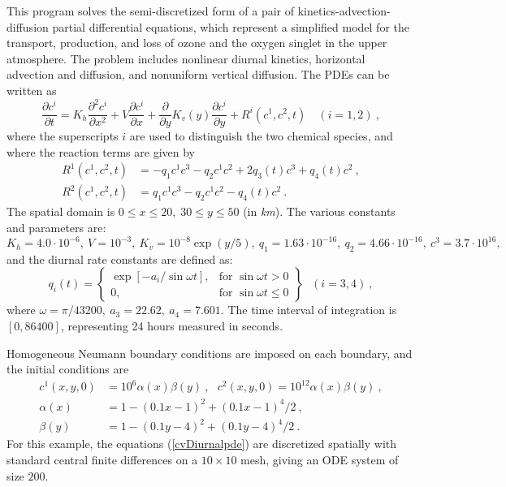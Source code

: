This program solves the semi-discretized form of a pair of
kinetics-advection-diffusion partial differential equations, which
represent a simplified model for the transport, production, and loss
of ozone and the oxygen singlet in the upper atmosphere.  The problem
includes nonlinear diurnal kinetics, horizontal advection and diffusion, 
and nonuniform vertical diffusion.  The PDEs can be written as
\begin{equation}\label{cvDiurnalpde}
  \frac{\partial c^i}{\partial t}=K_h\frac{\partial^2 c^i}{\partial x^2}
  +V \frac{\partial c^i}{\partial x}
  + \frac{\partial} {\partial y} K_v(y) \frac{\partial c^i}{\partial y}
  + R^i(c^1,c^2,t) \quad (i=1,2)~,
\end{equation}
where the superscripts $i$ are used to distinguish the two chemical
species, and where the reaction terms are given by
\begin{equation}\label{e:cvDiurnal:r}
\begin{split}
  R^1(c^1,c^2,t) & = -q_1c^1c^3-q_2c^1c^2+2q_3(t)c^3+q_4(t)c^2 ~, \\
  R^2(c^1,c^2,t) & = q_1c^1c^3-q_2c^1c^2-q_4(t)c^2 ~.
\end{split}
\end{equation}
The spatial domain is $0 \leq x \leq 20,\;30 \leq y \leq 50$ (in {\it km}). 
The various constants and parameters are: $K_h=4.0\cdot 10^{-6},
~ V=10^{-3},~ K_v=10^{-8}\exp (y/5),~ q_1=1.63\cdot 10^{-16},
~ q_2=4.66\cdot 10^{-16},~ c^3=3.7\cdot 10^{16},$ and the diurnal
rate constants are defined as:
\begin{equation*}
q_i(t) = 
\left\{ \begin{array}{ll}
  \exp [-a_i/\sin \omega t], & \mbox{for } \sin \omega t>0 \\
  0, & \mbox{for } \sin \omega t\leq 0
  \end{array} \right\} ~~~(i=3,4) ~,
\end{equation*}
where $\omega =\pi /43200, ~ a_3=22.62,~ a_4=7.601.$  The time interval of
integration is $[0, 86400]$, representing 24 hours measured in seconds.

Homogeneous Neumann boundary conditions are imposed on each boundary, and the
initial conditions are 
\begin{equation} \label{cvDiurnalic}
  \begin{split}
  c^{1}(x,y,0) &= 10^{6}\alpha (x)\beta (y) ~,~~~ 
                    c^{2}(x,y,0)=10^{12}\alpha(x)\beta (y) ~, \\
  \alpha (x) &= 1-(0.1x-1)^{2}+(0.1x-1)^{4}/2 ~, \\
  \beta (y) &= 1-(0.1y-4)^{2}+(0.1y-4)^{4}/2 ~.
  \end{split} 
\end{equation}
For this example, the equations (\ref{cvDiurnalpde}) are discretized spatially
with standard central finite differences on a $10 \times 10$ mesh,
giving an ODE system of size $200$.


